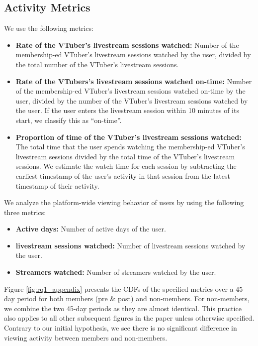 \newpage

\subsection{Activity Metrics}
\label{subsec:appendix_activity_metrics}

We use the following metrics:

\begin{itemize}[leftmargin=*]
    \item \textbf{Rate of the VTuber's livestream sessions watched:} Number of the membership-ed VTuber's livestream sessions watched by the user, divided by the total number of the VTuber's livestream sessions.
    \item \textbf{Rate of the VTubers's livestream sessions watched on-time:} Number of the membership-ed  VTuber's livestream sessions watched on-time by the user, divided by the number of the VTuber's livestream sessions watched by the user. 
    If the user enters the livestream session within 10 minutes of its start, we classify this as ``on-time''.
    \item \textbf{Proportion of time of the VTuber's livestream sessions watched:} The total time that the user spends watching the membership-ed VTuber's livestream sessions divided by the total time of the VTuber's livestream sessions.
    We estimate the watch time for each session by subtracting the earliest timestamp of the user's activity in that session from the latest timestamp of their activity.
\end{itemize}

We analyze the platform-wide viewing behavior of users by using the following three metrics:

\begin{itemize}[leftmargin=*]
    \item \textbf{Active days:} Number of active days of the user.
    \item \textbf{livestream sessions watched:} Number of livestream sessions watched by the user.
    \item \textbf{Streamers watched:} Number of streamers watched by the user.
\end{itemize}
% 

Figure \ref{fig:rq1_appendix} presents the CDFs of the specified metrics over a 45-day period for both members (pre \& post) and non-members. For non-members, we combine the two 45-day periods as they are almost identical. This practice also applies to all other subsequent figures in the paper unless otherwise specified.
Contrary to our initial hypothesis, we see there is no significant difference in viewing activity between members and non-members.


